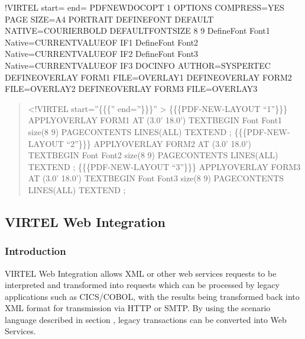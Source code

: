 \documentclass[letterpaper,10pt,english]{sphinxmanual}
\begin{document}

\begin{sphinxVerbatim}[commandchars=\\\{\}]
\PYGZlt{}!\PYGZhy{}\PYGZhy{}VIRTEL start=\PYGZdq{}\PYGZob{}\PYGZob{}\PYGZob{}\PYGZdq{} end=\PYGZdq{}\PYGZcb{}\PYGZcb{}\PYGZcb{}\PYGZdq{} \PYGZhy{}\PYGZhy{}\PYGZgt{}
\PYGZob{}\PYGZob{}\PYGZob{}PDF\PYGZhy{}NEW\PYGZhy{}DOCOPT \PYGZdq{}1\PYGZdq{}\PYGZcb{}\PYGZcb{}\PYGZcb{}
OPTIONS COMPRESS=YES
PAGE SIZE=A4 PORTRAIT
DEFINEFONT DEFAULT NATIVE=COURIER\PYGZhy{}BOLD
DEFAULTFONTSIZE 8 9
DefineFont Font1 Native=\PYGZob{}\PYGZob{}\PYGZob{}CURRENT\PYGZhy{}VALUE\PYGZhy{}OF \PYGZdq{}IF1\PYGZdq{}\PYGZcb{}\PYGZcb{}\PYGZcb{}
DefineFont Font2 Native=\PYGZob{}\PYGZob{}\PYGZob{}CURRENT\PYGZhy{}VALUE\PYGZhy{}OF \PYGZdq{}IF2\PYGZdq{}\PYGZcb{}\PYGZcb{}\PYGZcb{}
DefineFont Font3 Native=\PYGZob{}\PYGZob{}\PYGZob{}CURRENT\PYGZhy{}VALUE\PYGZhy{}OF \PYGZdq{}IF3\PYGZdq{}\PYGZcb{}\PYGZcb{}\PYGZcb{}
DOCINFO AUTHOR=\PYGZdq{}SYSPERTEC\PYGZdq{}
DEFINEOVERLAY FORM1 FILE=OVERLAY1
DEFINEOVERLAY FORM2 FILE=OVERLAY2
DEFINEOVERLAY FORM3 FILE=OVERLAY3
\end{sphinxVerbatim}

\begin{quote}

\textless{}!\textendash{}VIRTEL start=”\{\{\{” end=”\}\}\}” \textendash{}\textgreater{}
\{\{\{PDF-NEW-LAYOUT “1”\}\}\}
APPLYOVERLAY FORM1
AT (3.0’ 18.0’)
TEXTBEGIN
Font Font1 size(8 9)
PAGECONTENTS LINES(ALL)
TEXTEND
;
\{\{\{PDF-NEW-LAYOUT “2”\}\}\}
APPLYOVERLAY FORM2
AT (3.0’ 18.0’)
TEXTBEGIN
Font Font2 size(8 9)
PAGECONTENTS LINES(ALL)
TEXTEND
;
\{\{\{PDF-NEW-LAYOUT “3”\}\}\}
APPLYOVERLAY FORM3
AT (3.0’ 18.0’)
TEXTBEGIN
Font Font3 size(8 9)
PAGECONTENTS LINES(ALL)
TEXTEND
;
\end{quote}



\subsection{VIRTEL Web Integration}
\label{\detokenize{User_Guide:virtel-web-integration}}

\subsubsection{Introduction}
\label{\detokenize{User_Guide:id7}}
VIRTEL Web Integration allows XML or other web services requests to be interpreted and transformed into requests which can be processed by legacy applications such as CICS/COBOL, with the results being transformed back into XML format for transmission via HTTP or SMTP. By using the scenario language described in section {\hyperref[\detokenize{User_Guide:v457ug-virtel-scenarios}]{}}, legacy transactions can be converted into Web Services.
\end{document}
